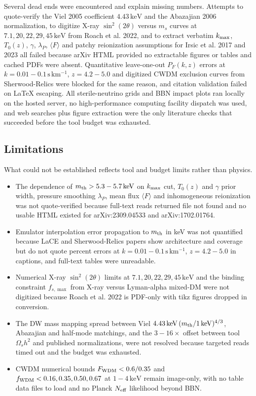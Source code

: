 \documentclass[11pt,a4paper]{article}
\begin{document}
Several dead ends were encountered and explain missing numbers. Attempts to quote-verify the Viel 2005 coefficient $4.43\,\mathrm{keV}$ and the Abazajian 2006 normalization, to digitize X-ray $\sin^2(2\theta)$ versus $m_s$ curves at $7.1, 20, 22, 29, 45\,\mathrm{keV}$ from Roach et al. 2022, and to extract verbatim $k_{\rm max}$, $T_0(z)$, $\gamma$, $\lambda_P$, $\langle F \rangle$ and patchy reionization assumptions for Irsic et al. 2017 and 2023 all failed because arXiv HTML provided no extractable figures or tables and cached PDFs were absent. Quantitative leave-one-out $P_F(k,z)$ errors at $k = 0.01-0.1\,\mathrm{s\,km^{-1}}$, $z = 4.2-5.0$ and digitized CWDM exclusion curves from Sherwood-Relics were blocked for the same reason, and citation validation failed on LaTeX escaping. All sterile-neutrino grids and BBN impact plots ran locally on the hosted server, no high-performance computing facility dispatch was used, and web searches plus figure extraction were the only literature checks that succeeded before the tool budget was exhausted.

\subsection{Limitations}
What could not be established reflects tool and budget limits rather than physics.

\begin{itemize}
  \item The dependence of $m_{\rm th} > 5.3-5.7\,\mathrm{keV}$ on $k_{\rm max}$ cut, $T_0(z)$ and $\gamma$ prior width, pressure smoothing $\lambda_P$, mean flux $\langle F \rangle$ and inhomogeneous reionization was not quote-verified because full-text reads returned file not found and no usable HTML existed for arXiv:2309.04533 and arXiv:1702.01764.
  \item Emulator interpolation error propagation to $m_{\rm th}$ in keV was not quantified because LaCE and Sherwood-Relics papers show architecture and coverage but do not quote percent errors at $k = 0.01-0.1\,\mathrm{s\,km^{-1}}$, $z = 4.2-5.0$ in captions, and full-text tables were unreadable.
  \item Numerical X-ray $\sin^2(2\theta)$ limits at $7.1, 20, 22, 29, 45\,\mathrm{keV}$ and the binding constraint $f_{s,\max}$ from X-ray versus Lyman-alpha mixed-DM were not digitized because Roach et al. 2022 is PDF-only with tikz figures dropped in conversion.
  \item The DW mass mapping spread between Viel $4.43\,\mathrm{keV}\,(m_{\rm th}/1\,\mathrm{keV})^{4/3}$, Abazajian and half-mode matchings, and the $3-16\times$ offset between tool $\Omega_s h^2$ and published normalizations, were not resolved because targeted reads timed out and the budget was exhausted.
  \item CWDM numerical bounds $F_{\rm WDM} < 0.6/0.35$ and $f_{\rm WDM} < 0.16, 0.35, 0.50, 0.67$ at $1-4\,\mathrm{keV}$ remain image-only, with no table data files to load and no Planck $N_{\rm eff}$ likelihood beyond BBN.
\end{itemize}
\end{document}
